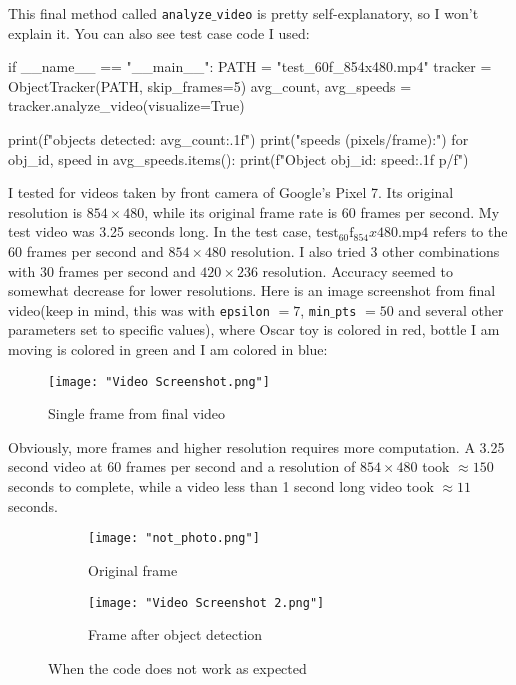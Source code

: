 \documentclass{article}
\begin{document}
	This final method called \texttt{analyze$\_$video} is pretty self-explanatory, so I won't explain it. You can also see test case code I used:
	
	\begin{python}
if __name__ == "__main__":
	PATH = "test_60f_854x480.mp4"
	tracker = ObjectTracker(PATH, skip_frames=5)
	avg_count, avg_speeds = tracker.analyze_video(visualize=True)
	
	print(f"\nAverage objects detected: {avg_count:.1f}")
	print("\nObject speeds (pixels/frame):")
	for obj_id, speed in avg_speeds.items():
		print(f"Object {obj_id}: {speed:.1f} p/f")\end{python}
	
	I tested for videos taken by front camera of Google's Pixel 7. Its original resolution is $854 \times 480$, while its original frame rate is 60 frames per second. My test video was 3.25 seconds long. In the test case, $\text{test}_60\text{f}_854x480.\text{mp}4$ refers to the 60 frames per second and $854 \times 480$ resolution. I also tried 3 other combinations with 30 frames per second and $420 \times 236$ resolution. Accuracy seemed to somewhat decrease for lower resolutions. Here is an image screenshot from final video(keep in mind, this was with \texttt{epsilon} $= 7$, \texttt{min$\_$pts}  $= 50$ and several other parameters set to specific values), where Oscar toy is colored in red, bottle I am moving is colored in green and I am colored in blue:
	
	\begin{figure}[H]
		\centering
		\texttt{[image: "Video Screenshot.png"]}
		\caption{Single frame from final video}
	\end{figure}

	Obviously, more frames and higher resolution requires more computation. A 3.25 second video at 60 frames per second and a resolution of $854 \times 480$ took $\approx 150$ seconds to complete, while a video less than 1 second long video took $\approx 11$ seconds.
	
	\begin{figure}[H]
		\centering
		\begin{subfigure}{0.45\textwidth}
			\centering
			\texttt{[image: "not\_photo.png"]}
			\caption{Original frame}
		\end{subfigure}
		\hfill
		\begin{subfigure}{0.45\textwidth}
			\centering
			\texttt{[image: "Video Screenshot 2.png"]}
			\caption{Frame after object detection}
		\end{subfigure}
		\caption{When the code does not work as expected}
	\end{figure}
\end{document}
